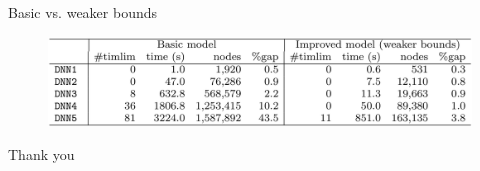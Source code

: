 \documentclass{beamer}
\begin{document}
\begin{frame}{Basic vs. weaker bounds}
  \begin{figure}
    \centering
    \includegraphics[width=\columnwidth]{tab-3.png}
  \end{figure}
\end{frame}

\begin{frame}
  \Huge{\centerline{Thank you}}
\end{frame}
\end{document}
